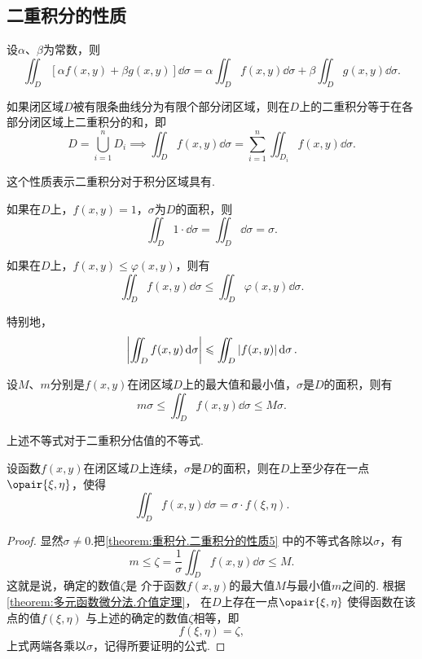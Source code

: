 \subsection{二重积分的性质}
\begin{property}\label{theorem:重积分.二重积分的性质1}
设\(\alpha\)、\(\beta\)为常数，则\[
\iint_D [\alpha f(x,y)+\beta g(x,y)] \dd{\sigma}
=\alpha \iint_D f(x,y) \dd{\sigma}
+\beta \iint_D g(x,y) \dd{\sigma}.
\]
\end{property}

\begin{property}\label{theorem:重积分.二重积分的性质2}
如果闭区域\(D\)被有限条曲线分为有限个部分闭区域，则在\(D\)上的二重积分等于在各部分闭区域上二重积分的和，即\[
D = \bigcup_{i=1}^n D_i
\implies
\iint_D f(x,y) \dd{\sigma}
= \sum\limits_{i=1}^n \iint_{D_i} f(x,y) \dd{\sigma}.
\]
\end{property}
这个性质表示二重积分对于积分区域具有.

\begin{property}\label{theorem:重积分.二重积分的性质3}
如果在\(D\)上，\(f(x,y)=1\)，\(\sigma\)为\(D\)的面积，则\[
\iint_D 1\cdot\dd{\sigma}
=\iint_D \dd{\sigma}
=\sigma.
\]
\end{property}

\begin{property}\label{theorem:重积分.二重积分的性质4}
如果在\(D\)上，\(f(x,y) \leqslant \varphi(x,y)\)，则有\[
\iint_D f(x,y) \dd{\sigma} \leqslant \iint_D \varphi(x,y) \dd{\sigma}.
\]

特别地，\[
\abs{\iint_D f(x,y) \dd{\sigma}} \leqslant \iint_D \abs{f(x,y)} \dd{\sigma}.
\]
\end{property}

\begin{property}\label{theorem:重积分.二重积分的性质5}
设\(M\)、\(m\)分别是\(f(x,y)\)在闭区域\(D\)上的最大值和最小值，\(\sigma\)是\(D\)的面积，则有\[
m\sigma \leqslant \iint_D f(x,y) \dd{\sigma} \leqslant M\sigma.
\]
\end{property}
上述不等式对于二重积分估值的不等式.

\begin{property}[二重积分的中值定理]\label{theorem:重积分.二重积分的中值定理}
设函数\(f(x,y)\)在闭区域\(D\)上连续，\(\sigma\)是\(D\)的面积，则在\(D\)上至少存在一点\(\opair{\xi,\eta}\)，使得\[
\iint_D f(x,y) \dd{\sigma} = \sigma \cdot f(\xi,\eta).
\]
\begin{proof}
显然\(\sigma\neq0\).把\cref{theorem:重积分.二重积分的性质5} 中的不等式各除以\(\sigma\)，有\[
m
\leqslant
\zeta = \frac{1}{\sigma} \iint_D f(x,y) \dd{\sigma}
\leqslant
M.
\]
这就是说，确定的数值\(\zeta\)是%
介于函数\(f(x,y)\)的最大值\(M\)与最小值\(m\)之间的.
根据\cref{theorem:多元函数微分法.介值定理}，%
在\(D\)上存在一点\(\opair{\xi,\eta}\)%
使得函数在该点的值\(f(\xi,\eta)\)%
与上述的确定的数值\(\zeta\)相等，即\[
f(\xi,\eta) = \zeta,
\]上式两端各乘以\(\sigma\)，记得所要证明的公式.
\end{proof}
\end{property}

